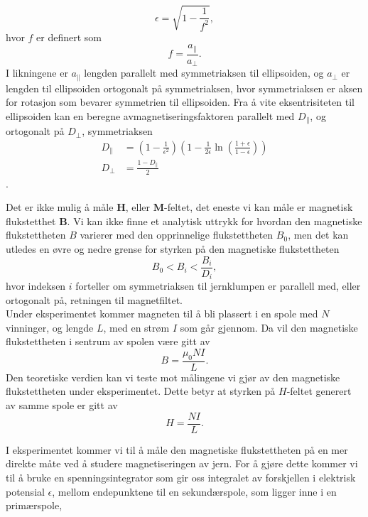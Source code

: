 \documentclass[%
 reprint,
 amsmath,amssymb,
 aps,
 norsk,
]{revtex4-1}
\begin{document}
\begin{equation}
  \epsilon = \sqrt{1-\frac{1}{f^2}},\label{eksent}
\end{equation}
hvor $f$ er definert som
\begin{equation*}
  f = \frac{a_{\parallel}}{a_{\perp}}.
\end{equation*}
I likningene er $a_{\parallel}$ lengden parallelt med symmetriaksen til ellipsoiden, og $a_{\perp}$ er lengden til ellipsoiden ortogonalt på symmetriaksen, hvor symmetriaksen er aksen for rotasjon som bevarer symmetrien til ellipsoiden. Fra å vite eksentrisiteten til ellipsoiden kan en beregne avmagnetiseringsfaktoren parallelt med $D_{\parallel}$, og ortogonalt på $D_{\perp}$, symmetriaksen
\begin{align*}
  D_{\parallel} &= \left(1-\frac{1}{\epsilon^2}\right)\left(1-\frac{1}{2\epsilon}\ln{\left(\frac{1+\epsilon}{1-\epsilon}\right)} \right) \\
  D_{\perp} &= \frac{1-D_{\parallel}}{2}
\end{align*}.
\par
Det er ikke mulig å måle $\bm{H}$, eller $\bm{M}$-feltet, det eneste vi kan måle er magnetisk flukstetthet $\bm{B}$. Vi kan ikke finne et analytisk uttrykk for hvordan den magnetiske flukstettheten $B$ varierer med den opprinnelige flukstettheten $B_0$, men det kan utledes en øvre og nedre grense for styrken på den magnetiske flukstettheten
\begin{equation}
  B_0 < B_i < \frac{B_i}{D_i}, \label{upper_limit}
\end{equation}
hvor indeksen $i$ forteller om symmetriaksen til jernklumpen er parallell med, eller ortogonalt på, retningen til magnetfiltet.
\\Under eksperimentet kommer magneten til å bli plassert i en spole med $N$ vinninger, og lengde $L$, med en strøm $I$ som går gjennom. Da vil den magnetiske flukstettheten i sentrum av spolen være gitt av
\begin{equation}
  B = \frac{\mu_0NI}{L}. \label{nice_b}
\end{equation}Den teoretiske verdien kan vi teste mot målingene vi gjør av den magnetiske flukstettheten under eksperimentet. Dette betyr at styrken på $H$-feltet generert av samme spole er gitt av
\begin{equation}
  H = \frac{NI}{L}. \label{nice_H}
\end{equation}
\par
I eksperimentet kommer vi til å måle den magnetiske flukstettheten på en mer direkte måte ved å studere magnetiseringen av jern. For å gjøre dette kommer vi til å bruke en spenningsintegrator som gir oss integralet av forskjellen i elektrisk potensial $\epsilon$, mellom endepunktene til en sekundærspole, som ligger inne i en primærspole,
\end{document}
